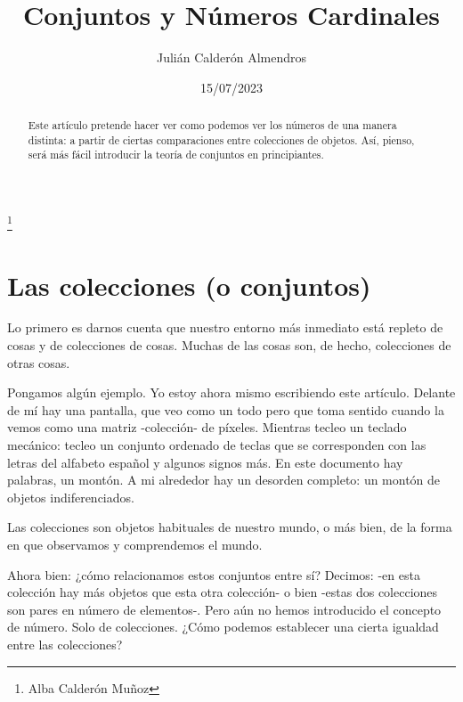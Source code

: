 \documentclass{amsart}
\theoremstyle{definition}
\theoremstyle{remark}
\numberwithin{equation}{section}
\begin{document}
	
	\title{Conjuntos y Números Cardinales}%
	\author{Julián Calderón Almendros}%
	\address{Málaga, España}%
	
	\thanks{Alba Calderón Muñoz}%
	
	\date{15/07/2023}%
	
	\begin{abstract}
		Este artículo pretende hacer ver como podemos ver los números de
una manera distinta: a partir de ciertas comparaciones entre colecciones de
objetos. Así, pienso, será más fácil introducir la teoría de conjuntos en
principiantes.
	\end{abstract}
	\maketitle
	\section{Las colecciones (o conjuntos)}
	
	
	Lo primero es darnos cuenta que nuestro entorno más inmediato está
repleto de cosas y de colecciones de cosas. Muchas de las cosas son, de
hecho, colecciones de otras cosas.
	
	
	Pongamos algún ejemplo. Yo estoy ahora mismo escribiendo este artículo.
Delante de mí hay una pantalla, que veo como un todo pero que toma sentido
cuando la vemos como una matriz -colección- de píxeles. Mientras tecleo un
teclado mecánico: tecleo un conjunto ordenado de teclas que se corresponden
con las letras del alfabeto español y algunos signos más. En este documento
hay palabras, un montón. A mi alrededor hay un desorden completo: un montón
de objetos indiferenciados.
	
	
	Las colecciones son objetos habituales de nuestro mundo, o más bien, de
la forma en que observamos y comprendemos el mundo.
	
	
	
	Ahora bien: ¿cómo relacionamos estos conjuntos entre sí? Decimos: -en
esta colección hay más objetos que esta otra colección- o bien -estas dos
colecciones son pares en número de elementos-. Pero aún no hemos introducido
el concepto de número. Solo de colecciones. ¿Cómo podemos establecer una
cierta igualdad entre las colecciones?
	
\end{document}
